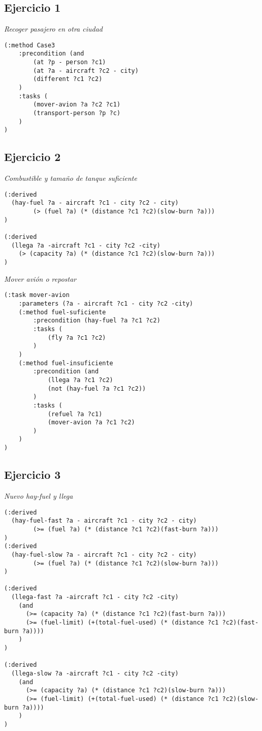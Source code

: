 \documentclass{article}
\begin{document}
\subsection*{Ejercicio 1}

\emph{Recoger pasajero en otra ciudad}

\begin{lstlisting}
(:method Case3 
	:precondition (and 
		(at ?p - person ?c1)
		(at ?a - aircraft ?c2 - city)
		(different ?c1 ?c2)
	)
	:tasks (
		(mover-avion ?a ?c2 ?c1)
		(transport-person ?p ?c)
	)
)
\end{lstlisting}

\subsection*{Ejercicio 2}

\emph{Combustible y tamaño de tanque suficiente}

\begin{lstlisting}
(:derived 
  (hay-fuel ?a - aircraft ?c1 - city ?c2 - city)
        (> (fuel ?a) (* (distance ?c1 ?c2)(slow-burn ?a)))
)

(:derived 
  (llega ?a -aircraft ?c1 - city ?c2 -city)
    (> (capacity ?a) (* (distance ?c1 ?c2)(slow-burn ?a)))
)
\end{lstlisting}

\emph{Mover avión o repostar}

\begin{lstlisting}
(:task mover-avion
	:parameters (?a - aircraft ?c1 - city ?c2 -city)
	(:method fuel-suficiente
		:precondition (hay-fuel ?a ?c1 ?c2)
		:tasks (
			(fly ?a ?c1 ?c2)
		)
	)
	(:method fuel-insuficiente
		:precondition (and
			(llega ?a ?c1 ?c2)
			(not (hay-fuel ?a ?c1 ?c2))
		)
		:tasks (
			(refuel ?a ?c1)
			(mover-avion ?a ?c1 ?c2)
		)
	)
)
\end{lstlisting}

\subsection*{Ejercicio 3}

\emph{Nuevo hay-fuel y llega}

\begin{lstlisting}
(:derived 
  (hay-fuel-fast ?a - aircraft ?c1 - city ?c2 - city)
        (>= (fuel ?a) (* (distance ?c1 ?c2)(fast-burn ?a)))
)
(:derived 
  (hay-fuel-slow ?a - aircraft ?c1 - city ?c2 - city)
        (>= (fuel ?a) (* (distance ?c1 ?c2)(slow-burn ?a)))
)

(:derived 
  (llega-fast ?a -aircraft ?c1 - city ?c2 -city)
    (and
      (>= (capacity ?a) (* (distance ?c1 ?c2)(fast-burn ?a)))
      (>= (fuel-limit) (+(total-fuel-used) (* (distance ?c1 ?c2)(fast-burn ?a))))
    )
)

(:derived 
  (llega-slow ?a -aircraft ?c1 - city ?c2 -city)
    (and
      (>= (capacity ?a) (* (distance ?c1 ?c2)(slow-burn ?a)))
      (>= (fuel-limit) (+(total-fuel-used) (* (distance ?c1 ?c2)(slow-burn ?a))))
    )
)
\end{lstlisting}
\end{document}
